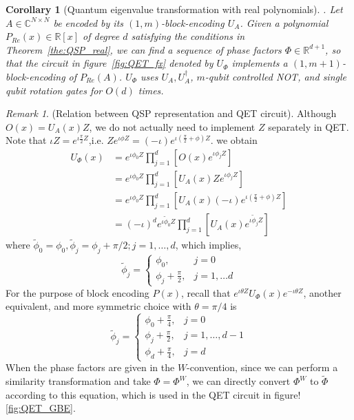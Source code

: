 \documentclass[12pt, oneside]{book}
\newtheorem{corollary}[theorem]{Corollary}
\theoremstyle{definition}
\theoremstyle{definition}
\theoremstyle{remark}
\newtheorem*{remark}{Remark}
\begin{document}
\begin{corollary}
    [Quantum eigenvalue transformation with real polynomials]. Let $A \in \mathbb{C}^{N\times N}$ be encoded by its $(1,m)$-block-encoding $U_A$. Given a polynomial $P_{Re}(x)\in\mathbb{R}[x]$ of degree $d$ satisfying the conditions in Theorem~\ref{the:QSP_real}, we can find a sequence of phase factors $\Phi\in\mathbb{R}^{d+1}$, so that the circuit in figure~\ref{fig:QET_fx} denoted by $U_{\Phi}$ implements a $(1,m+1)$-block-encoding of $P_{Re}(A)$. $U_{\Phi}$ uses $U_A,U_A^{\dagger}$, $m$-qubit controlled NOT, and single qubit rotation gates for $O(d)$ times.
\end{corollary}
\begin{remark}
    (Relation between QSP representation and QET circuit). Although $O(x)=U_A(x)Z$, we do not actually need to implement $Z$ separately in QET. Note that $\iota Z=e^{\iota \frac{\pi}{2}Z}$,i.e. $Ze^{\iota \phi Z}=(-\iota)e^{\iota (\frac{\pi}{2}+\phi)Z}$. we obtain
    \begin{align*}
    U_{\Phi}(x)&=e^{\iota \phi_0Z}\prod_{j=1}^d [O(x)e^{\iota \phi_j Z}]\\
    &=e^{\iota \phi_0Z}\prod_{j=1}^d [U_A(x)Ze^{\iota \phi_jZ}]\\
    &=e^{\iota \phi_0Z}\prod_{j=1}^d [U_A(x)(-\iota)e^{\iota (\frac{\pi}{2}+\phi)Z}]\\
    &=(-\iota)^de^{\iota \tilde{\phi}_0Z}\prod_{j=1}^d[U_A(x)e^{\iota \tilde{\phi}_jZ}]
    \end{align*}
    where $\tilde{\phi}_0=\phi_0,\tilde{\phi}_j=\phi_j+\pi/2; j=1,\ldots,d$, which implies,
    \[
    \tilde{\phi}_j = \begin{cases}
        \phi_0, &j=0\\
        \phi_j+\frac{\pi}{2},& j=1,\ldots d
    \end{cases}
    \]
    For the purpose of block encoding $P(x)$, recall that $e^{\iota \theta Z}U_{\Phi}(x)e^{-\iota \theta Z}$, another equivalent, and more symmetric choice with $\theta=\pi/4$ is
    \[
    \tilde{\phi}_j =\begin{cases}
        \phi_0+\frac{\pi}{4}, &j=0\\
        \phi_j + \frac{\pi}{2}, &j=1,\ldots ,d-1\\
        \phi_d+\frac{\pi}{4}, &j=d
    \end{cases}
    \]
    When the phase factors are given in the $W$-convention, since we can perform a similarity transformation and take $\Phi=\Phi^W$, we can directly convert $\Phi^W$ to $\tilde{\Phi}$ according to this equation, which is used in the QET circuit in figure!\ref{fig:QET_GBE}.
\end{remark}
\end{document}
